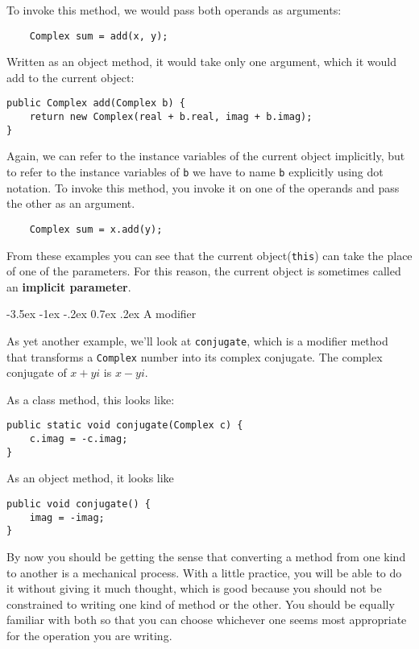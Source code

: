 \documentclass{book}
\makeatletter
\renewcommand{\section}{\@startsection 
    {section} {1} {0mm}%
    {-3.5ex \@plus -1ex \@minus -.2ex}%
    {0.7ex \@plus.2ex}%
    {\normalfont\Large\bfseries}}
\makeatother
\begin{document}
To invoke this method, we would pass both operands as arguments:

\begin{verbatim}
    Complex sum = add(x, y);
\end{verbatim}

Written as an object method, it would take only one argument,
which it would add to the current object:

\begin{verbatim}
public Complex add(Complex b) {
    return new Complex(real + b.real, imag + b.imag);
}
\end{verbatim}

Again, we can refer to the instance variables of the current
object implicitly, but to refer to the instance variables of
{\tt b} we have to name {\tt b} explicitly using dot notation.
To invoke this method, you invoke it on one of the operands
and pass the other as an argument.


\begin{verbatim}
    Complex sum = x.add(y);
\end{verbatim}

From these examples you can see that the current object({\tt this})
can take the place of one of the parameters.  For this reason,
the current object is sometimes called an {\bf implicit parameter}.


\section{A modifier}

As yet another example, we'll look at {\tt conjugate}, which is
a modifier method that transforms a {\tt Complex} number into
its complex conjugate.  The complex conjugate of $x + yi$ is
$x - yi$.

As a class method, this looks like:

\begin{verbatim}
public static void conjugate(Complex c) {
    c.imag = -c.imag;
}
\end{verbatim}

As an object method, it looks like

\begin{verbatim}
public void conjugate() {
    imag = -imag;
}
\end{verbatim}

By now you should be getting the sense that converting a method
from one kind to another is a mechanical process.  With a little
practice, you will be able to do it without giving it much
thought, which is good because you should not be constrained to
writing one kind of method or the other.  You should be equally
familiar with both so that you can choose whichever one seems
most appropriate for the operation you are writing.
\end{document}
